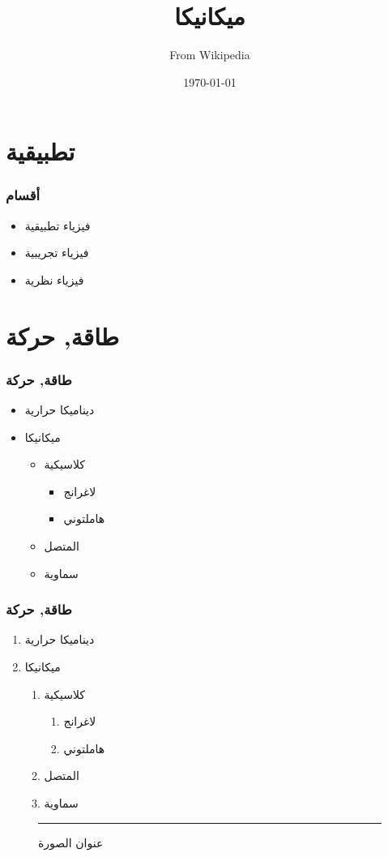 \documentclass{beamer}
\title{ميكانيكا}
\author{From Wikipedia}
\date{\today}
\begin{document}
\begin{frame}
\titlepage
\end{frame}

\begin{frame}
\frametitle{\contentsname}
\tableofcontents
\end{frame}

\section{تطبيقية}

\begin{frame}
\frametitle{أقسام}
\begin{itemize}
\item فيزياء تطبيقية
\item فيزياء تجريبية
\item فيزياء نظرية
\end{itemize}



\end{frame}

\section{طاقة, حركة}

\begin{frame}
\frametitle{طاقة, حركة}
\begin{itemize}
\item ديناميكا حرارية
\item ميكانيكا
\begin{itemize}
\item كلاسيكية
\begin{itemize}
\item لاغرانج
\item هاملتوني
\end{itemize}
\item المتصل
\item سماوية
\end{itemize}
\end{itemize}
\end{frame}

\begin{frame}
\frametitle{طاقة, حركة}
\begin{enumerate}
\item ديناميكا حرارية
\item ميكانيكا
\begin{enumerate}
\item كلاسيكية
\begin{enumerate}
\item لاغرانج
\item هاملتوني
\end{enumerate}
\item المتصل
\item سماوية
\end{enumerate}
\end{enumerate}

\begin{figure}
\centering
\rule{2cm}{2cm}
\caption{عنوان الصورة}
\end{figure}


\end{frame}
\end{document}
